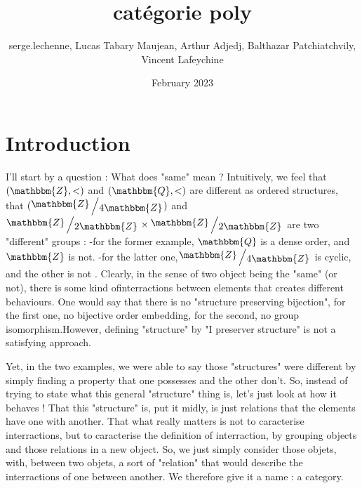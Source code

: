 \documentclass{article}
\title{catégorie poly}
\author{serge.lechenne, Lucas Tabary Maujean, Arthur Adjedj, Balthazar Patchiatchvily, Vincent Lafeychine }
\date{February 2023}
\newcommand{\quotient}[2]{{\raisebox{.2em}{$#1$}\left/\raisebox{-.2em}{$#2$}\right.}}
\begin{document}
\maketitle

\section{Introduction}
I'll start by a question : What does "same" mean ? \newline
Intuitively, we feel that $(\mathbbm{Z}, <)$ and $(\mathbbm{Q}, <)$ are different as ordered structures, that 
$(\quotient{\mathbbm{Z}}{4 \mathbbm{Z}})$ and $\quotient{\mathbbm{Z}}{2\mathbbm{Z}} \times \quotient{\mathbbm{Z}}{2\mathbbm{Z}}$ are two "different" groups : \newline 
-for the former example, $\mathbbm{Q}$ is a dense order, and $\mathbbm{Z}$ is not. \newline
-for the latter one,$\quotient{\mathbbm{Z}}{4 \mathbbm{Z}}$ is cyclic, and the other is not . \newline \newline
Clearly, in the sense of two object being the "same" (or not), there is some kind ofinterractions between elements that creates different behaviours. One would say that there is no "structure preserving bijection", for the first one, no bijective order embedding, for the second, no group isomorphism.However, defining "structure" by "I preserver structure" is not a satisfying approach. \newline \newline

Yet, in the two examples, we were able to say those "structures" were different by simply finding a property that one possesses and the other don't. So, instead of trying to state what this general "structure" thing is, let's just look at how it behaves ! That this "structure" is, put it midly, is just relations that the elements have one with another. That what really matters is not to caracterise interractions, but to caracterise the definition of interraction, by grouping objects and those relations in a new object. So, we just simply consider those objets, with, between two objets, a sort of "relation" that would describe the interractions of one between another. \newline
We therefore give it a name : a category.

\newpage
\end{document}
